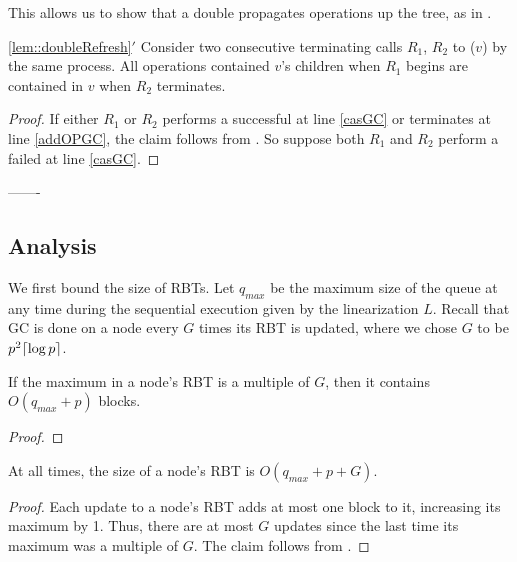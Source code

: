 This allows us to show that a double  propagates operations up the tree, 
as in .

\begin{customlemma}{\ref{lem::doubleRefresh}$'$}\label{lem::doubleRefreshGC}
Consider two consecutive terminating calls $R_1$, $R_2$ to ($v$) by the same process.
All operations contained $v$'s children when $R_1$ begins
are contained in $v$ when $R_2$ terminates.
\end{customlemma}
\begin{proof}
If either $R_1$ or $R_2$ performs a successful  at line \ref{casGC} or terminates at line \ref{addOPGC}, the claim follows
from .
So suppose both $R_1$ and $R_2$ perform a failed  at line \ref{casGC}.

\end{proof}





-------

\subsection{Analysis}

We first bound the size of RBTs.  Let $q_{max}$ be the maximum size of the queue at any time during the sequential execution given by the linearization $L$.
Recall that GC is done on a node every $G$ times its RBT is updated, where we chose $G$ to be $p^2\lceil \log p \rceil$.

\begin{lemma}\label{boundAfterGC}
If the maximum  in a node's RBT is a multiple of $G$, then
it contains $O(q_{max}+p)$ blocks.
\end{lemma}
\begin{proof}
\end{proof}


\begin{corollary}\label{RBTbound}
At all times, the size of a node's RBT is $O(q_{max}+p+G)$. 
\end{corollary}
\begin{proof}
Each update to a node's RBT adds at most one block to it, increasing its maximum  by 1.
Thus, there are at most $G$ updates since the last time its maximum  was a multiple of $G$.
The claim follows from .
\end{proof}

